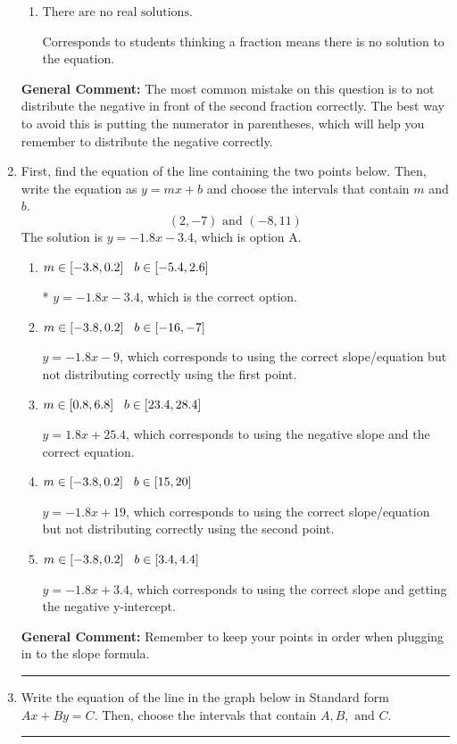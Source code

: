 \documentclass{extbook}[14pt]
\newcommand{\litem}[1]{\item #1

\rule{\textwidth}{0.4pt}}
\begin{document}
\begin{enumerate}
{\begin{enumerate}[label=\Alph*.]
$x = -2.642$, which corresponds to getting the negative of the actual solution.
\item \( \text{There are no real solutions.} \)

Corresponds to students thinking a fraction means there is no solution to the equation.
\end{enumerate}

\textbf{General Comment:} The most common mistake on this question is to not distribute the negative in front of the second fraction correctly. The best way to avoid this is putting the numerator in parentheses, which will help you remember to distribute the negative correctly.
}
\litem{
First, find the equation of the line containing the two points below. Then, write the equation as $ y=mx+b $ and choose the intervals that contain $m$ and $b$.
\[ (2, -7) \text{ and } (-8, 11) \]
The solution is \( y = -1.8x -3.4 \), which is option A.\begin{enumerate}[label=\Alph*.]
\item \( m \in [-3.8, 0.2] \hspace*{3mm} b \in [-5.4, 2.6] \)

* $y = -1.8x -3.4$, which is the correct option.
\item \( m \in [-3.8, 0.2] \hspace*{3mm} b \in [-16, -7] \)

 $y = -1.8x -9$, which corresponds to using the correct slope/equation but not distributing correctly using the first point.
\item \( m \in [0.8, 6.8] \hspace*{3mm} b \in [23.4, 28.4] \)

 $y = 1.8x + 25.4$, which corresponds to using the negative slope and the correct equation.
\item \( m \in [-3.8, 0.2] \hspace*{3mm} b \in [15, 20] \)

 $y = -1.8x + 19$, which corresponds to using the correct slope/equation but not distributing correctly using the second point.
\item \( m \in [-3.8, 0.2] \hspace*{3mm} b \in [3.4, 4.4] \)

 $y = -1.8x + 3.4$, which corresponds to using the correct slope and getting the negative y-intercept.
\end{enumerate}

\textbf{General Comment:} Remember to keep your points in order when plugging in to the slope formula.
}
\litem{
Write the equation of the line in the graph below in Standard form $Ax+By=C$. Then, choose the intervals that contain $A, B, \text{ and } C$.

}
\end{enumerate}
\end{document}

